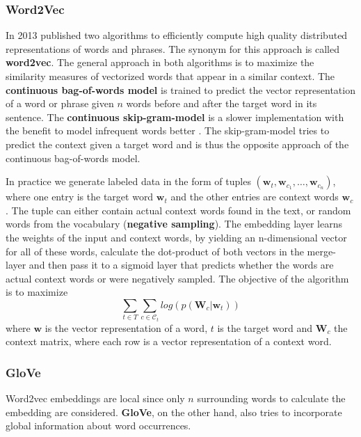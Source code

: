 \subsubsection{Word2Vec}
In 2013 \citeauthor{Mikolov2013} published two algorithms to efficiently compute high quality distributed representations of words and phrases. The synonym for this approach is called \textbf{word2vec}. The general approach in both algorithms is to maximize the similarity measures of vectorized words that appear in a similar context. The \textbf{continuous bag-of-words model} is trained to predict the vector representation of a word or phrase given $n$ words before and after the target word in its sentence. The \textbf{continuous skip-gram-model} is a slower implementation with the benefit to model infrequent words better \citep{word2vec}. The skip-gram-model tries to predict the context given a target word and is thus the opposite approach of the continuous bag-of-words model.

In practice we generate labeled data in the form of tuples $(\mathbf{w}_t, \mathbf{w}_{c_{1}}, \dots, \mathbf{w}_{c_{n}})$, where one entry is the target word $\mathbf{w}_t$ and the other entries are context words $\mathbf{w}_c$. The tuple can either contain actual context words found in the text, or random words from the vocabulary (\textbf{negative sampling}). The embedding layer learns the weights of the input and context words, by yielding an n-dimensional vector for all of these words, calculate the dot-product of both vectors in the merge-layer and then pass it to a sigmoid layer that predicts whether the words are actual context words or were negatively sampled. The objective of the algorithm is to maximize
    \[\sum_{t \in T} \sum_{c \in \mathcal{C}_t} log( p(\mathbf{W}_c|\mathbf{w}_t))\]
    where $\mathbf{w}$ is the vector representation of a word, $t$ is the target word and $\mathbf{W}_c$ the context matrix, where each row is a vector representation of a context word.

\subsubsection{GloVe}
Word2vec embeddings are local since only $n$ surrounding words to calculate the embedding are considered. \textbf{GloVe}, on the other hand, also tries to incorporate global information about word occurrences.

